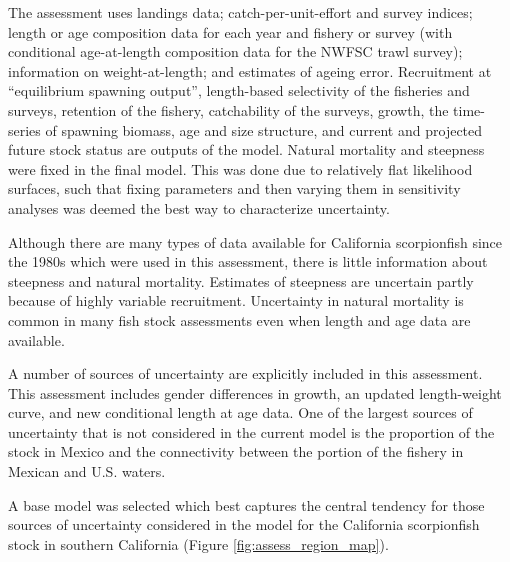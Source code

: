 \documentclass[12pt,]{article}
\begin{document}
The assessment uses landings data; catch-per-unit-effort and survey
indices; length or age composition data for each year and fishery or
survey (with conditional age-at-length composition data for the NWFSC
trawl survey); information on weight-at-length; and estimates of ageing
error. Recruitment at ``equilibrium spawning output'', length-based
selectivity of the fisheries and surveys, retention of the fishery,
catchability of the surveys, growth, the time-series of spawning
biomass, age and size structure, and current and projected future stock
status are outputs of the model. Natural mortality and steepness were
fixed in the final model. This was done due to relatively flat
likelihood surfaces, such that fixing parameters and then varying them
in sensitivity analyses was deemed the best way to characterize
uncertainty.

Although there are many types of data available for California
scorpionfish since the 1980s which were used in this assessment, there
is little information about steepness and natural mortality. Estimates
of steepness are uncertain partly because of highly variable
recruitment. Uncertainty in natural mortality is common in many fish
stock assessments even when length and age data are available.

A number of sources of uncertainty are explicitly included in this
assessment. This assessment includes gender differences in growth, an
updated length-weight curve, and new conditional length at age data. One
of the largest sources of uncertainty that is not considered in the
current model is the proportion of the stock in Mexico and the
connectivity between the portion of the fishery in Mexican and U.S.
waters.

A base model was selected which best captures the central tendency for
those sources of uncertainty considered in the model for the California
scorpionfish stock in southern California (Figure
\ref{fig:assess_region_map}).
\end{document}
